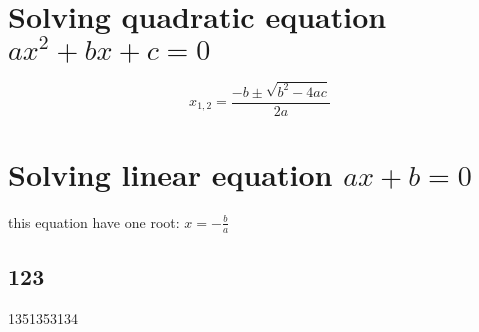 \documentclass{article}
\author{You}
\begin{document}
\section{Solving quadratic equation $ax^2+bx+c=0$}


\begin{equation}
x_{1,2}=\frac{-b\pm\sqrt{b^2 - 4ac}}{2a}
\end{equation}
\section{Solving linear equation $ax+b=0$}
this equation have one root: 
$x = -\frac{b}{a}$
\subsection{123}
1351353134
\end{document}

